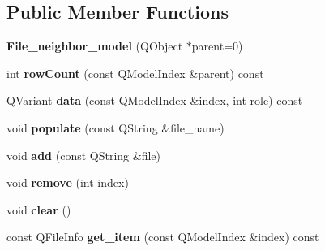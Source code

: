 \subsection*{Public Member Functions}
\begin{DoxyCompactItemize}
\item 
\hypertarget{class_log__viewer_1_1_file__neighbor__model_a875a577f1b7c49b96b20f31b69541b66}{{\bfseries File\-\_\-neighbor\-\_\-model} (Q\-Object $\ast$parent=0)}\label{class_log__viewer_1_1_file__neighbor__model_a875a577f1b7c49b96b20f31b69541b66}

\item 
\hypertarget{class_log__viewer_1_1_file__neighbor__model_a585628f128ef1c2d33856f8a368815b5}{int {\bfseries row\-Count} (const Q\-Model\-Index \&parent) const }\label{class_log__viewer_1_1_file__neighbor__model_a585628f128ef1c2d33856f8a368815b5}

\item 
\hypertarget{class_log__viewer_1_1_file__neighbor__model_a8f944a0893f1266cb44ceec27ede7057}{Q\-Variant {\bfseries data} (const Q\-Model\-Index \&index, int role) const }\label{class_log__viewer_1_1_file__neighbor__model_a8f944a0893f1266cb44ceec27ede7057}

\item 
\hypertarget{class_log__viewer_1_1_file__neighbor__model_a0748630f568df0d9d4b34074804db901}{void {\bfseries populate} (const Q\-String \&file\-\_\-name)}\label{class_log__viewer_1_1_file__neighbor__model_a0748630f568df0d9d4b34074804db901}

\item 
\hypertarget{class_log__viewer_1_1_file__neighbor__model_afe5a8cfeac88cc3b048cd096fdccdbe2}{void {\bfseries add} (const Q\-String \&file)}\label{class_log__viewer_1_1_file__neighbor__model_afe5a8cfeac88cc3b048cd096fdccdbe2}

\item 
\hypertarget{class_log__viewer_1_1_file__neighbor__model_a5b8f4b2a94f9d6a3b801478c8487de35}{void {\bfseries remove} (int index)}\label{class_log__viewer_1_1_file__neighbor__model_a5b8f4b2a94f9d6a3b801478c8487de35}

\item 
\hypertarget{class_log__viewer_1_1_file__neighbor__model_a6d25d14d638dfa7cc898d3384b02a354}{void {\bfseries clear} ()}\label{class_log__viewer_1_1_file__neighbor__model_a6d25d14d638dfa7cc898d3384b02a354}

\item 
\hypertarget{class_log__viewer_1_1_file__neighbor__model_aeebb698a61905772571a33be24fd9a87}{const Q\-File\-Info {\bfseries get\-\_\-item} (const Q\-Model\-Index \&index) const }\label{class_log__viewer_1_1_file__neighbor__model_aeebb698a61905772571a33be24fd9a87}


\end{DoxyCompactItemize}
